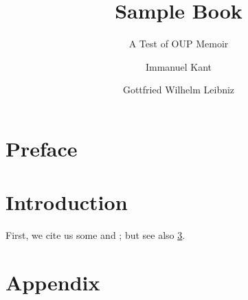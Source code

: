 \documentclass[print]{oupmemoir}
\title{Sample Book}
\subtitle{A Test of OUP Memoir}
\author{Immanuel Kant\and Gottfried Wilhelm Leibniz}
\begin{document}
\maketitle

\tableofcontents*

\indexoff %

\chapter{Preface}

\kant[1-5] %

\indexon

\mainmatter

\chapter{Introduction}

First, we cite us some \textcite{Kant1746} and \textcite{Leibniz1890};
but see also \cref{app}.

\kant[6-20]

\appendix

\chapter{Appendix}\label{app}

\kant[11-13]

\backmatter


\indexoff 

\printbibliography

\indexon

\printindex
\end{document}
